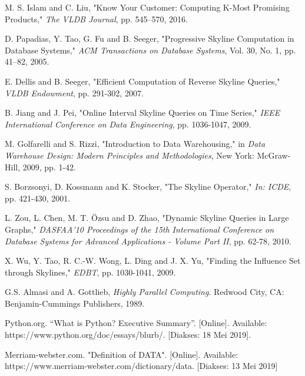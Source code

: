 \begin{thebibliography}{9}
	M. S. Islam and C. Liu, "Know Your Customer: Computing K-Most Promising Products," \textit{The VLDB Journal}, pp. 545–570, 2016.
	
	D. Papadias, Y. Tao, G. Fu and B. Seeger, "Progressive Skyline Computation in Database Systems," \textit{ACM Transactions on Database Systems}, Vol. 30, No. 1, pp. 41–82, 2005.
	
	E. Dellis and B. Seeger, "Efficient Computation of Reverse Skyline Queries," \textit{VLDB Endowment}, pp. 291-302, 2007.
	
	B. Jiang and J. Pei, "Online Interval Skyline Queries on Time Series," \textit{IEEE International Conference on Data Engineering}, pp. 1036-1047, 2009.
	
	M. Golfarelli and S. Rizzi, "Introduction to Data Warehousing," in \textit{Data Warehouse Design: Modern Principles and Methodologies}, New York: McGraw-Hill, 2009, pp. 1-42. 
	
	S. Borzsonyi, D. Kossmann and K. Stocker, "The Skyline Operator," \textit{In: ICDE}, pp. 421-430, 2001.
	
	L. Zou, L. Chen, M. T. Özsu and D. Zhao, "Dynamic Skyline Queries in Large Graphs," \textit{DASFAA'10 Proceedings of the 15th International Conference on Database Systems for Advanced Applications - Volume Part II}, pp. 62-78, 2010.
	
	X. Wu, Y. Tao, R. C.-W. Wong, L. Ding and J. X. Yu, "Finding the Influence Set through Skylines," \textit{EDBT}, pp. 1030-1041, 2009.
	
	G.S. Almasi and A. Gottlieb, \textit{Highly Parallel Computing}. Redwood City, CA: Benjamin-Cummings Publishers, 1989.
	
	Python.org. “What is Python? Executive Summary”. [Online]. Available: https://www.python.org/doc/essays/blurb/. [Diakses: 18 Mei 2019].
	
	Merriam-webster.com. "Definition of DATA". [Online]. Available: https://www.merriam-webster.com/dictionary/data. [Diakses: 13 Mei 2019]
		
\end{thebibliography}
